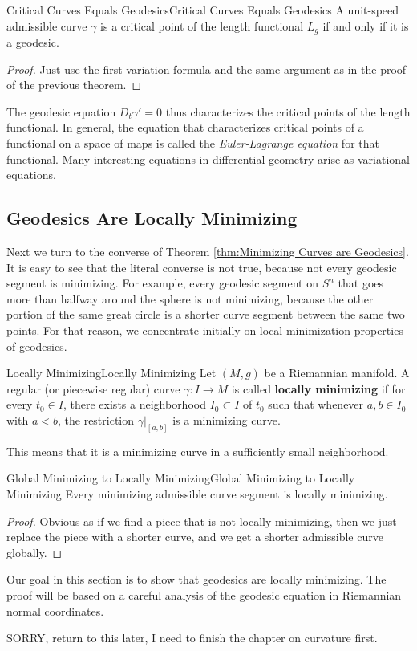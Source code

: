 \documentclass[../main.tex]{subfiles}
\begin{document}
\begin{proposition}{Critical Curves Equals Geodesics}{Critical Curves Equals Geodesics}
  A unit-speed admissible curve $\gamma$ is a critical point of the length functional $L_g$ if and only if it is a geodesic.
\end{proposition}
\begin{proof}
  Just use the first variation formula and the same argument as in the proof of the previous theorem.
\end{proof}

The geodesic equation $D_t \gamma' = 0$ thus characterizes the critical points of the length functional. In general, the equation that characterizes critical points of a functional on a space of maps is called the \emph{Euler-Lagrange equation} for that functional. Many interesting equations in differential geometry arise as variational equations.

\subsection{Geodesics Are Locally Minimizing}
Next we turn to the converse of Theorem \ref{thm:Minimizing Curves are Geodesics}. It is easy to see that the literal converse is not true, because not every geodesic segment is minimizing. For example, every geodesic segment on $S^n$ that goes more than halfway around the sphere is not minimizing, because the other portion of the same great circle is a shorter curve segment between the same two points. For that reason, we concentrate initially on local minimization properties of geodesics.

\begin{definition}{Locally Minimizing}{Locally Minimizing}
  Let $(M,g)$ be a Riemannian manifold. A regular (or piecewise regular) curve $\gamma: I \to M$ is called \textbf{locally minimizing} if for every $t_0 \in I$, there exists a neighborhood $I_0 \subset I$ of $t_0$ such that whenever $a, b \in I_0$ with $a < b$, the restriction $\gamma|_{[a,b]}$ is a minimizing curve.
\end{definition}
This means that it is a minimizing curve in a sufficiently small neighborhood.

\begin{lemma}{Global Minimizing to Locally Minimizing}{Global Minimizing to Locally Minimizing}
  Every minimizing admissible curve segment is locally minimizing.
\end{lemma}
\begin{proof}
  Obvious as if we find a piece that is not locally minimizing, then we just replace the piece with a shorter curve, and we get a shorter admissible curve globally.
\end{proof}

Our goal in this section is to show that geodesics are locally minimizing. The proof will be based on a careful analysis of the geodesic equation in Riemannian normal coordinates.

SORRY, return to this later, I need to finish the chapter on curvature first.
\end{document}
